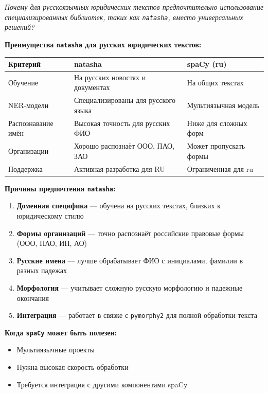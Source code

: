 \documentclass[12pt, a4paper]{report}
\begin{document}
\textit{Почему для русскоязычных юридических текстов предпочтительно использование
специализированных библиотек, таких как \texttt{natasha}, вместо универсальных
решений?}

\textbf{Преимущества \texttt{natasha} для русских юридических текстов:}

\begin{table}[h]
  \centering
  \begin{tabularx}{0.9\textwidth}{l X X}
    \toprule
    \rowcolor{LightBlue}
    \textsf{\textbf{Критерий}} & \textsf{\textbf{natasha}} & \textsf{\textbf{spaCy (ru)}} \\
    \midrule
    Обучение & На русских новостях и документах & На общих текстах \\
    NER-модели & Специализированы для русского языка & Мультиязычная модель \\
    Распознавание имён & Высокая точность для русских ФИО & Ниже для сложных форм \\
    Организации & Хорошо распознаёт ООО, ПАО, ЗАО & Может пропускать формы \\
    Поддержка & Активная разработка для RU & Ограниченная для ru \\
    \bottomrule
  \end{tabularx}
\end{table}

\textbf{Причины предпочтения \texttt{natasha}:}
\begin{enumerate}
  \item \textbf{Доменная специфика} — обучена на русских текстах, близких к юридическому стилю
  \item \textbf{Формы организаций} — точно распознаёт российские правовые формы (ООО, ПАО, ИП, АО)
  \item \textbf{Русские имена} — лучше обрабатывает ФИО с инициалами, фамилии в разных падежах
  \item \textbf{Морфология} — учитывает сложную русскую морфологию и падежные окончания
  \item \textbf{Интеграция} — работает в связке с \texttt{pymorphy2} для полной обработки текста
\end{enumerate}

\textbf{Когда \texttt{spaCy} может быть полезен:}
\begin{itemize}
  \item Мультиязычные проекты
  \item Нужна высокая скорость обработки
  \item Требуется интеграция с другими компонентами spaCy
\end{itemize}
\end{document}
